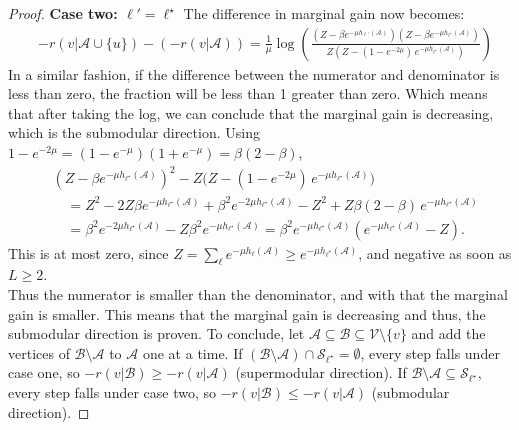 \documentclass{article}
\def \setA{\mathcal{A}}
\def \setB{\mathcal{B}}
\def \setS{\mathcal{S}}
\def \setV{\mathcal{V}}
\begin{document}
\begin{proof}
    \textbf{Case two: $\ell' = \ell^\star$}
    The difference in marginal gain now becomes:
    \begin{align}
        &-r(v|\setA\cup \{u\}) - (-r(v|\setA)) =\frac{1}{\mu}\log\left( \frac{(Z-\beta e^{-\mu h_{\ell'}(\setA)})(Z-\beta e^{-\mu h_{\ell^\star}(\setA)})}{Z(Z - (1-e^{-2\mu})\, e^{-\mu h_{\ell^\star}(\setA)})}
        \right)
    \end{align}
    In a similar fashion, if the difference between the numerator and denominator is less than zero, the fraction will be less than 1 greater than zero. Which means that after taking the log, we can conclude that the marginal gain is decreasing, which is the submodular direction.
Using $1-e^{-2\mu} = (1-e^{-\mu})(1+e^{-\mu}) = \beta(2-\beta)$,
\begin{align*}
        &(Z-\beta e^{-\mu h_{\ell^\star}(\setA)})^2-Z\bigl(Z - (1-e^{-2\mu})\, e^{-\mu h_{\ell^\star}(\setA)}\bigr)\\
        &\quad = Z^2-2Z\beta e^{-\mu h_{\ell^\star}(\setA)}+\beta^2 e^{-2\mu h_{\ell^\star}(\setA)} -Z^2+Z\beta(2-\beta)\, e^{-\mu h_{\ell^\star}(\setA)}\\
        &\quad = \beta^2 e^{-2\mu h_{\ell^\star}(\setA)}-Z\beta^2 e^{-\mu h_{\ell^\star}(\setA)}
         = \beta^2 e^{-\mu h_{\ell^\star}(\setA)}\left(e^{-\mu h_{\ell^\star}(\setA)}-Z\right).
    \end{align*}
    This is at most zero, since $Z = \sum_\ell e^{-\mu h_\ell(\setA)} \geq e^{-\mu h_{\ell^\star}(\setA)}$, and negative as soon as $L \geq 2$.\\ \newline \noindent
    Thus the numerator is smaller than the denominator, and with that the marginal gain is smaller. This means that the marginal gain is decreasing and thus, the submodular direction is proven. \newline \newline \noindent
    To conclude, let $\setA \subseteq \setB \subseteq \setV\setminus\{v\}$ and add the vertices of $\setB\setminus\setA$ to $\setA$ one at a time. If $(\setB \setminus \setA)\cap \setS_{\ell^\star} = \emptyset$, every step falls under case one, so $-r(v|\setB) \geq -r(v|\setA)$ (supermodular direction). If $\setB \setminus \setA \subseteq \setS_{\ell^\star}$, every step falls under case two, so $-r(v|\setB) \leq -r(v|\setA)$ (submodular direction).
	\end{proof}
\end{document}
